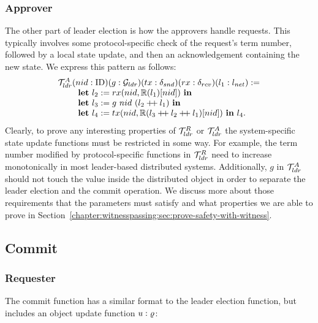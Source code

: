 \subsubsection{Approver}
The other part of leader election is how the approvers handle requests.
This typically involves some protocol-specific check of the request's
term number, followed by a local state update, and then an acknowledgement
containing the new state. We express this pattern as follows:
$$
\begin{array}{l}
	\mathcal{T}^{A}_{ldr} (nid: \mathrm{ID}) (g:  \mathcal{G}_{ldr})
	(tx: \delta_{snd})(rx: \delta_{rcv})(l_1  :{l_{net}} ) := \\
\ \ \ \ \ \ \ \mbox{\textbf{let}} \ l_2 := rx(nid, \mathbb{R}(l_1)[nid]) \
  \mbox{\textbf{in}} \\
\ \ \ \ \ \ \ \mbox{\textbf{let}}\ l_3  := g\ nid \ (l_2 \mathbin{+\mkern-4mu+} l_1) \ \mbox{\textbf{in}} \\
\ \ \ \ \ \ \ \mbox{\textbf{let}} \ l_4 :=  tx(nid, \mathbb{R}(l_3 \mathbin{+\mkern-4mu+} l_2 \mathbin{+\mkern-4mu+} l_1)[nid]) \ \mbox{\textbf{in}} \ l_4.
   \\
\end{array}
$$
Clearly, to prove any interesting properties of $\mathcal{T}^{R}_{ldr}$ or $\mathcal{T}^{A}_{ldr}$
the system-specific state update functions must be restricted in some way.
For example, the term number modified by protocol-specific functions in $\mathcal{T}^{R}_{ldr}$
need to increase monotonically in most leader-based distributed systems.
Additionally, $g$ in $\mathcal{T}^{A}_{ldr}$ should not touch the value inside
the distributed object in order to separate the leader election and the commit operation.
We discuss more about those requirements that the parameters must satisfy and what properties we
are able to prove in Section~\ref{chapter:witnesspassing:sec:prove-safety-with-witness}.

\subsection{Commit}
\label{chapter:witnesspassing:subsec:commit}

\subsubsection{Requester}
The commit function has a similar format to the leader election function, but
includes an object update function $u : \varrho$:

